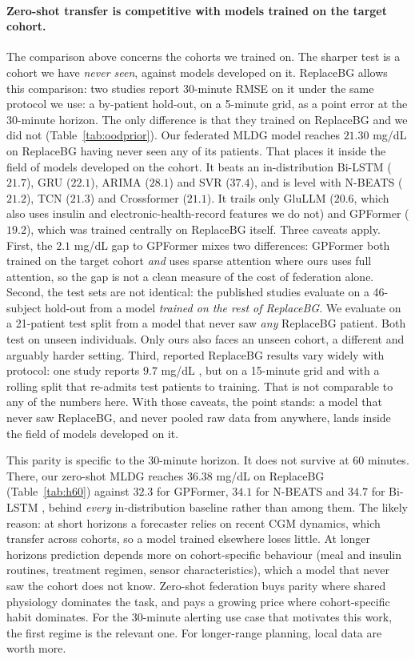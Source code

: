 \documentclass[10pt,letterpaper]{article}
\begin{document}
\paragraph{Zero-shot transfer is competitive with models trained on the target
cohort.} The comparison above concerns the cohorts we trained on. The sharper
test is a cohort we have \emph{never seen}, against models developed on it.
ReplaceBG allows this comparison: two studies report 30-minute RMSE on it
under the same protocol we use: a by-patient hold-out, on a 5-minute grid,
as a point error at the 30-minute horizon. The only difference is that they
trained on ReplaceBG and we did not (Table~\ref{tab:oodprior}). Our federated
MLDG model reaches $21.30$ mg/dL on ReplaceBG having never seen any of its
patients. That places it inside the field of models developed on the cohort.
It beats an in-distribution Bi-LSTM ($21.7$), GRU ($22.1$), ARIMA ($28.1$)
and SVR ($37.4$), and is level with N-BEATS ($21.2$), TCN ($21.3$) and
Crossformer ($21.1$). It trails only GluLLM ($20.6$, which also uses insulin
and electronic-health-record features we do not) and GPFormer ($19.2$), which
was trained centrally on ReplaceBG itself. Three caveats apply. First, the
$2.1$ mg/dL gap to GPFormer mixes two differences: GPFormer both trained on
the target cohort \emph{and} uses sparse attention where ours uses full
attention, so the gap is not a clean measure of the cost of federation alone.
Second, the test sets are not identical: the published studies evaluate on a
46-subject hold-out from a model \emph{trained on the rest of ReplaceBG}. We
evaluate on a 21-patient test split from a model that never saw \emph{any}
ReplaceBG patient. Both test on unseen individuals. Only ours also faces an
unseen cohort, a different and arguably harder setting. Third, reported
ReplaceBG results vary widely with protocol: one study reports $9.7$ mg/dL
\cite{jaloli2023cnnlstm}, but on a 15-minute grid and with a rolling split
that re-admits test patients to training. That is not comparable to any of
the numbers here. With those caveats, the point stands: a model that never
saw ReplaceBG, and never pooled raw data from anywhere, lands inside the
field of models developed on it.

This parity is specific to the 30-minute horizon. It does not survive at 60
minutes. There, our zero-shot MLDG reaches $36.38$ mg/dL on ReplaceBG
(Table~\ref{tab:h60}) against $32.3$ for GPFormer, $34.1$ for N-BEATS and
$34.7$ for Bi-LSTM \cite{zhu2024gpformer}, behind \emph{every}
in-distribution baseline rather than among them. The likely reason: at short
horizons a forecaster relies on recent CGM dynamics, which transfer across
cohorts, so a model trained elsewhere loses little. At longer horizons
prediction depends more on cohort-specific behaviour (meal and insulin
routines, treatment regimen, sensor characteristics), which a model that
never saw the cohort does not know. Zero-shot federation buys parity where
shared physiology dominates the task, and pays a growing price where
cohort-specific habit dominates. For the 30-minute alerting use case that
motivates this work, the first regime is the relevant one. For longer-range
planning, local data are worth more.
\end{document}
